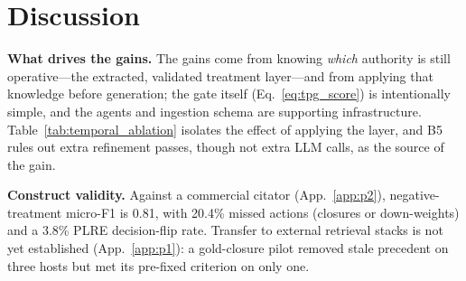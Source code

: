 \section{Discussion}
\label{sec:discussion}

\textbf{What drives the gains.} The gains come from knowing \emph{which} authority is still operative---the extracted, validated treatment layer---and from applying that knowledge before generation; the gate itself (Eq.~\eqref{eq:tpg_score}) is intentionally simple, and the agents and ingestion schema are supporting infrastructure. Table~\ref{tab:temporal_ablation} isolates the effect of applying the layer, and B5 rules out extra refinement passes, though not extra LLM calls, as the source of the gain.

\textbf{Construct validity.} Against a commercial citator (App.~\ref{app:p2}), negative-treatment micro-F1 is 0.81, with 20.4\% missed actions (closures or down-weights) and a 3.8\% PLRE decision-flip rate. Transfer to external retrieval stacks is not yet established (App.~\ref{app:p1}): a gold-closure pilot removed stale precedent on three hosts but met its pre-fixed criterion on only one.
